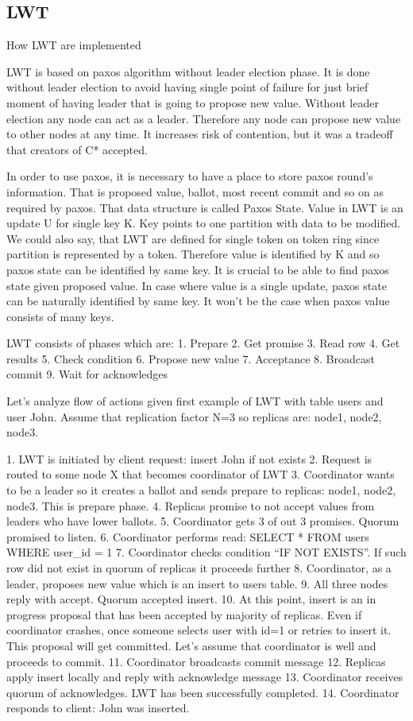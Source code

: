 \subsection{LWT}

 How LWT are implemented


LWT is based on paxos algorithm without leader election phase. It is done without leader election to avoid having single point of failure for just brief moment of having leader that is going to propose new value. Without leader election any node can act as a leader. Therefore any node can propose new value to other nodes at any time. It increases risk of contention, but it was a tradeoff that creators of C* accepted. 


In order to use paxos, it is necessary to have a place to store paxos round’s information. That is proposed value, ballot, most recent commit and so on as required by paxos. That data structure is called Paxos State.
Value in LWT is an update U for single key K. Key points to one partition with data to be modified. We could also say, that LWT are defined for single token on token ring since partition is represented by a token.
Therefore value is identified by K and so paxos state can be identified by same key. It is crucial to be able to find paxos state given proposed value. In case where value is a single update, paxos state can be naturally identified by same key. It won’t be the case when paxos value consists of many keys.


LWT consists of phases which are:
1. Prepare
2. Get promise
3. Read row
4. Get results
5. Check condition
6. Propose new value
7. Acceptance
8. Broadcast commit
9. Wait for acknowledges


Let’s analyze flow of actions given first example of LWT with table users and user John.
Assume that replication factor N=3 so replicas are: node1, node2, node3.


1. LWT is initiated by client request: insert John if not exists
2. Request is routed to some node X that becomes coordinator of LWT
3. Coordinator wants to be a leader so it creates a ballot and sends prepare to replicas: node1, node2, node3. This is prepare phase.
4. Replicas promise to not accept values from leaders who have lower ballots.
5. Coordinator gets 3 of out 3 promises. Quorum promised to listen.
6. Coordinator performs read: SELECT * FROM users WHERE user_id = 1
7. Coordinator checks condition “IF NOT EXISTS”. If such row did not exist in quorum of replicas it proceeds further
8. Coordinator, as a leader, proposes new value which is an insert to users table.
9. All three nodes reply with accept. Quorum accepted insert.
10. At this point, insert is an in progress proposal that has been accepted by majority of replicas. Even if coordinator crashes, once someone selects user with id=1 or retries to insert it. This proposal will get committed. Let’s assume that coordinator is well and proceeds to commit.
11. Coordinator broadcasts commit message
12. Replicas apply insert locally and reply with acknowledge message
13. Coordinator receives quorum of acknowledges. LWT has been successfully completed.
14. Coordinator responds to client: John was inserted.


